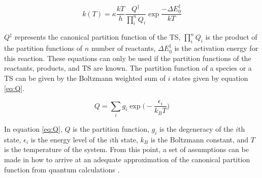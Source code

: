 \documentclass[preprint, 11pt]{elsarticle} %
\begin{document}
\begin{equation}
    k(T) = \kappa \frac{k T}{h} \frac{Q^\ddagger}{\prod^{n}_{i} Q_i} \exp{\frac{-\Delta E^{\ddagger}_{0}}{k T}}
    \label{eyring:2}
\end{equation}

$Q^\ddagger$ represents the canonical partition function of the TS, $\prod^n_i Q_i$ is the product of the partition functions of $n$ number of reactants, $\Delta E^{\ddagger}_0$ is the activation energy for this reaction.
These equations can only be used if the partition functions of the reactants, products, and TS are known. 
The partition function of a species or a TS can be given by the Boltzmann weighted sum of $i$ states given by equation \ref{eq:Q}.

\begin{equation}
    Q = \sum_i g_i \exp\Big(-\frac{\epsilon_i}{k_B T})
    \label{eq:Q}
\end{equation}

In equation \ref{eq:Q}, $Q$ is the partition function, $g_i$ is the degeneracy of the $i$th state, $\epsilon_i$ is the energy level of the $i$th state, $k_B$ is the Boltzmann constant, and $T$ is the temperature of the system.
From this point, a set of assumptions can be made in how to arrive at an adequate approximation of the canonical partition function from quantum calculations \cite{Truhlar:1991}. 
\end{document}
